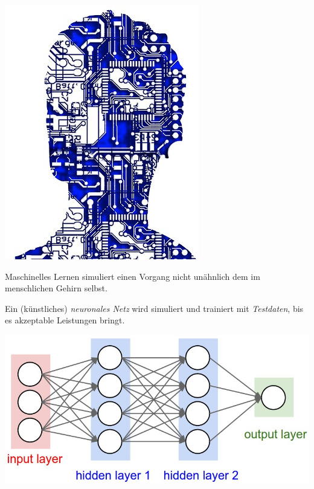 \documentclass[aspectratio=169,x11names]{beamer}
\begin{document}
\begin{frame}
\begin{multicols}{2}
\includegraphics[scale=0.4]{images/artificial-intelligence-507813_640.jpg} 
\columnbreak

Maschinelles Lernen simuliert einen Vorgang nicht unähnlich dem im menschlichen Gehirn selbst.
\pause\bigskip

Ein (künstliches) \emph{neuronales Netz} wird simuliert und trainiert mit \emph{Testdaten}, bis es akzeptable Leistungen bringt.
\end{multicols}
\end{frame}

\begin{frame}
\begin{center}
\includegraphics[width=\textwidth]{images/simple_neural_network_header.jpg} 
\end{center}
\end{frame}
\end{document}
